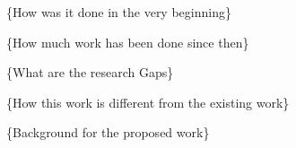 \{How was it done in the very beginning\}

\{How much work has been done since then\}

\{What are the research Gaps\}

\{How this work is different from the existing work\}

\{Background for the proposed work\}







